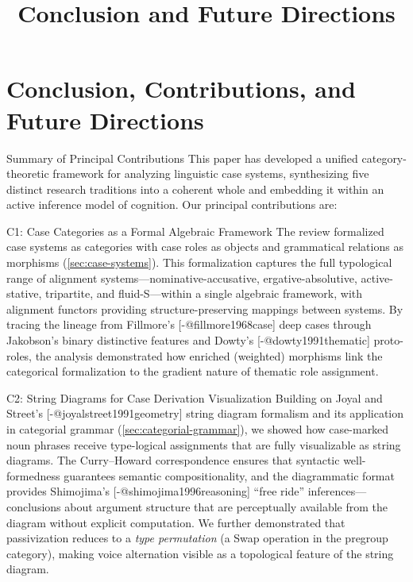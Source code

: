 \documentclass[
  ignorenonframetext,
]{beamer}
\title{\texorpdfstring{Conclusion and Future
Directions}{Conclusion and Future Directions}}
\author{\texorpdfstring{}{}}
\date{}
\begin{document}
\frame{\titlepage}

\section{Conclusion, Contributions, and Future
Directions}\label{sec:conclusion}

\begin{frame}{Summary of Principal Contributions}
\protect{}\label{summary-of-principal-contributions}
This paper has developed a unified category-theoretic framework for
analyzing linguistic case systems, synthesizing five distinct research
traditions into a coherent whole and embedding it within an active
inference model of cognition. Our principal contributions are:

\begin{block}{C1: Case Categories as a Formal Algebraic Framework}
\protect{}\label{c1-case-categories-as-a-formal-algebraic-framework}
The review formalized case systems as categories with case roles as
objects and grammatical relations as morphisms
(\autoref{sec:case-systems}). This formalization captures the full
typological range of alignment systems---nominative-accusative,
ergative-absolutive, active-stative, tripartite, and fluid-S---within a
single algebraic framework, with alignment functors providing
structure-preserving mappings between systems. By tracing the lineage
from Fillmore's {[}-@fillmore1968case{]} deep cases through Jakobson's
binary distinctive features and Dowty's {[}-@dowty1991thematic{]}
proto-roles, the analysis demonstrated how enriched (weighted) morphisms
link the categorical formalization to the gradient nature of thematic
role assignment.
\end{block}

\begin{block}{C2: String Diagrams for Case Derivation Visualization}
\protect{}\label{c2-string-diagrams-for-case-derivation-visualization}
Building on Joyal and Street's {[}-@joyalstreet1991geometry{]} string
diagram formalism and its application in categorial grammar
(\autoref{sec:categorial-grammar}), we showed how case-marked noun
phrases receive type-logical assignments that are fully visualizable as
string diagrams. The Curry--Howard correspondence ensures that syntactic
well-formedness guarantees semantic compositionality, and the
diagrammatic format provides Shimojima's {[}-@shimojima1996reasoning{]}
``free ride'' inferences---conclusions about argument structure that are
perceptually available from the diagram without explicit computation. We
further demonstrated that passivization reduces to a \emph{type
permutation} (a Swap operation in the pregroup category), making voice
alternation visible as a topological feature of the string diagram.
\end{block}


\end{frame}
\end{document}
